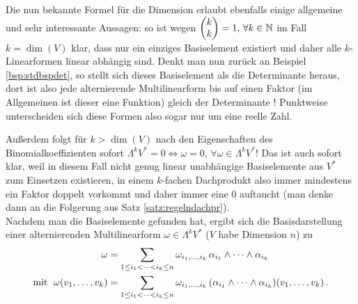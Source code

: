 \documentclass[../H_Analysis_main.tex]{subfiles}
\begin{document}


Die nun bekannte Formel für die Dimension erlaubt ebenfalls einige allgemeine und sehr interessante Aussagen: so ist wegen $\mqty(k \\ k) = 1, \, \forall k \in \mathbb{N}$ im Fall $k = \dim(V)$ klar, dass nur ein einziges Basiselement existiert und daher alle $k$-Linearformen linear abhängig sind. Denkt man nun zurück an Beispiel \ref{bsp:stdbspdet}, so stellt sich dieses Basiselement als die Determinante heraus, dort ist also jede alternierende Multilinearform bis auf einen Faktor (im Allgemeinen ist dieser eine Funktion) gleich der Determinante ! Punktweise unterscheiden sich diese Formen also sogar nur um eine reelle Zahl.

Außerdem folgt für $k > \dim(V)$ nach den Eigenschaften des Binomialkoeffizienten sofort $\Lambda^k V^* = \qty{0} \Leftrightarrow \omega = 0, \, \forall \omega \in \Lambda^k V^*$! Das ist auch sofort klar, weil in diesem Fall nicht genug linear unabhängige Basiselemente aus $V^*$ zum Einsetzen existieren, in einem $k$-fachen Dachprodukt also immer mindestens ein Faktor doppelt vorkommt und daher immer eine 0 auftaucht (man denke dann an die Folgerung aus Satz \ref{satz:regelndachpr}).\\


Nachdem man die Basiselemente gefunden hat, ergibt sich die Basisdarstellung einer alternierenden Multilinearform $\omega \in \Lambda^k V^*$ ($V$ habe Dimension $n$) zu
\begin{equation*}
\begin{split}
\omega &= \sum_{1 \leq i_1 < \dots < i_k \leq n} \omega_{i_1, \dots, i_k} \, \alpha_{i_1} \wedge \dots \wedge \alpha_{i_k}
\\
\text{mit } \; \omega(v_1, \dots, v_k) &= \sum_{1 \leq i_1 < \dots < i_k \leq n} \omega_{i_1, \dots, i_k} \, \qty(\alpha_{i_1} \wedge \dots \wedge \alpha_{i_k})(v_1, \dots, v_k) \, .
\end{split}
\end{equation*}
\end{document}
